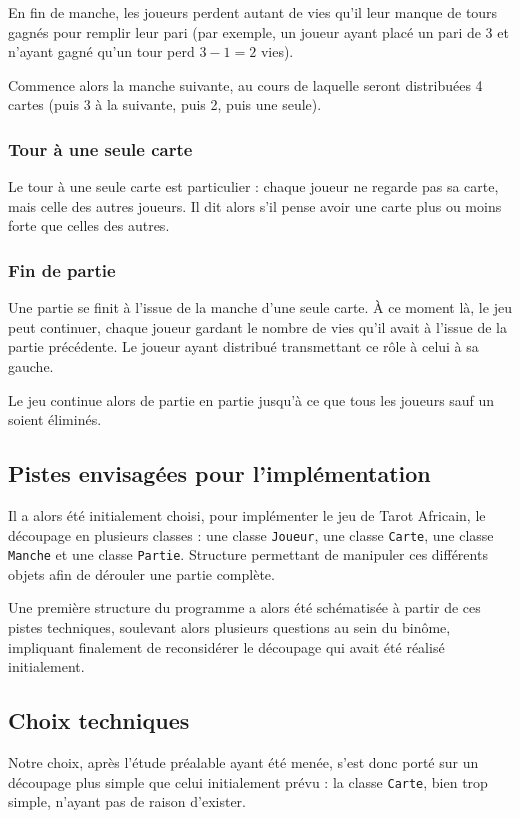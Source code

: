          En fin de manche, les joueurs perdent autant de vies qu'il leur manque de tours gagnés pour remplir leur pari (par exemple, un joueur ayant placé un pari de 3 et n'ayant gagné qu'un tour perd $3-1 = 2$ vies).

         Commence alors la manche suivante, au cours de laquelle seront distribuées 4 cartes (puis 3 à la suivante, puis 2, puis une seule).
      \subsubsection{Tour à une seule carte}
         Le tour à une seule carte est particulier : chaque joueur ne regarde pas sa carte, mais celle des autres joueurs.
         Il dit alors s'il pense avoir une carte plus ou moins forte que celles des autres.
      \subsubsection{Fin de partie}
         Une partie se finit à l'issue de la manche d'une seule carte.
         À ce moment là, le jeu peut continuer, chaque joueur gardant le nombre de vies qu'il avait à l'issue de la partie précédente.
         Le joueur ayant distribué transmettant ce rôle à celui à sa gauche.

         Le jeu continue alors de partie en partie jusqu'à ce que tous les joueurs sauf un soient éliminés.

   \subsection{Pistes envisagées pour l'implémentation}\label{subsec:pistes-envisagées-pour-l'implémentation}
      Il a alors été initialement choisi, pour implémenter le jeu de Tarot Africain, le découpage en plusieurs classes : une classe \texttt{Joueur}, une classe \texttt{Carte}, une classe \texttt{Manche} et une classe \texttt{Partie}.
      Structure permettant de manipuler ces différents objets afin de dérouler une partie complète.

      Une première structure du programme a alors été schématisée à partir de ces pistes techniques, soulevant alors plusieurs questions au sein du binôme, impliquant finalement de reconsidérer le découpage qui avait été réalisé initialement.

   \subsection{Choix techniques}\label{subsec:choix-techniques}
      Notre choix, après l'étude préalable ayant été menée, s'est donc porté sur un découpage plus simple que celui initialement prévu : la classe \texttt{Carte}, bien trop simple, n'ayant pas de raison d'exister.

